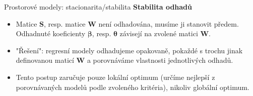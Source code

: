 \documentclass{beamer}
\begin{document}
\begin{frame}{Prostorové modely:  stacionarita/stabilita}
\textbf{Stabilita odhadů}
\begin{itemize}
	\item Matice $\bm{S}$, resp. matice $\bm{W}$ není odhadována, musíme ji stanovit předem. Odhadnuté koeficienty $\bm{\beta}$, resp. $\bm{\theta}$ závisejí na zvolené matici $\bm{W}$.
	\item "Řešení": regresní modely odhadujeme opakovaně, pokaždé s trochu jinak definovanou maticí $\bm{W}$ a porovnáváme vlastnosti jednotlivých odhadů.
    \item Tento postup zaručuje pouze lokální optimum (určíme nejlepší z porovnávaných modelů podle zvoleného kritéria), nikoliv globální optimum.
	\end{itemize}
\end{frame}
\end{document}
